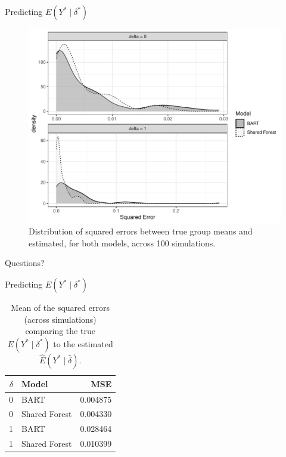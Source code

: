\documentclass{beamer}
\begin{document}
\begin{frame}{Predicting $E(Y^* \mid \delta^*)$ }
\begin{figure}
\includegraphics[width = .7\linewidth]{continuous_sim_results.pdf}
\caption{Distribution of squared errors between true group means and estimated, for both models, across 100 simulations. }
\end{figure}
\end{frame}

\begin{frame}
\begin{center}
Questions?
\end{center}
\end{frame}

 \begin{frame}{Predicting $E(Y^* \mid \delta^*)$ }
 
 \begin{table}[ht]
 \centering
 \begin{tabular}{rlr}
   \hline
 $\delta$ & Model & MSE\\
   \hline
 0 & BART & 0.004875  \\ 
   0 & Shared Forest & 0.004330  \\ 
   1 & BART & 0.028464  \\ 
   1 & Shared Forest & 0.010399  \\ 
    \hline
 \end{tabular}
 \caption{\label{tab:mse} Mean of the squared errors (across simulations) comparing the true $E(Y^* \mid \delta^*)$ to the estimated $\hat{E}(Y^* \mid \hat{\delta})$.}
 \end{table}
 
 \end{frame}
\end{document}
